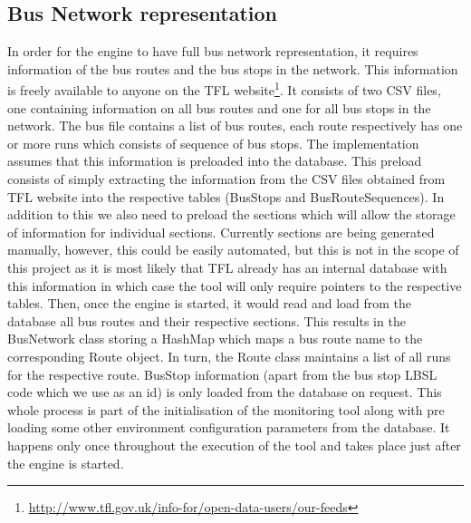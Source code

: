 \FloatBarrier
\subsection{Bus Network representation}
In order for the engine to have full bus network representation, it requires information of the bus routes and the bus stops in the network. This information is freely available to anyone on the TFL website\footnote{\url{http://www.tfl.gov.uk/info-for/open-data-users/our-feeds}}. It consists of two CSV files, one containing information on all bus routes and one for all bus stops in the network. The bus file contains a list of bus routes, each route respectively has one or more runs which consists of sequence of bus stops. The implementation assumes that this information is preloaded into the database. This preload consists of simply extracting the information from the CSV files obtained from TFL website into the respective tables (BusStops and BusRouteSequences). In addition to this we also need to preload the sections which will allow the storage of information for individual sections. Currently sections are being generated manually, however, this could be easily automated, but this is not in the scope of this project as it is most likely that TFL already has an internal database with this information in which case the tool will only require pointers to the respective tables. Then, once the engine is started, it would read and load from the database all bus routes and their respective sections. This results in the BusNetwork class storing a HashMap which maps a bus route name to the corresponding Route object. In turn, the Route class maintains a list of all runs for the respective route. BusStop information (apart from the bus stop LBSL code which we use as an id) is only loaded from the database on request. This whole process is part of the initialisation of the monitoring tool along with pre loading some other environment configuration parameters from the database. It happens only once throughout the execution of the tool and takes place just after the engine is started.

